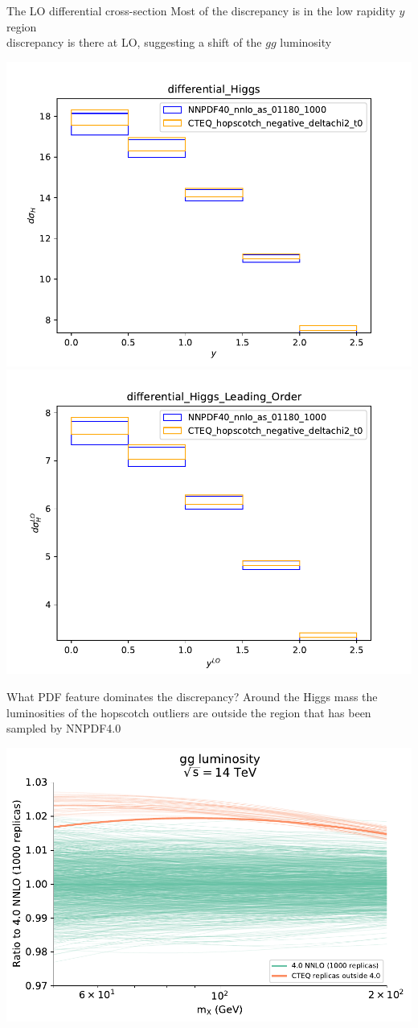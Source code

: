 \documentclass[aspectratio=169,10pt]{beamer}
\begin{document}
\begin{frame}[t]{The LO differential cross-section}
  Most of the discrepancy is in the low rapidity $y$ region\\
  \vspace*{0.5em}
  discrepancy is there at LO, suggesting a shift of the $gg$ luminosity
  \begin{center}
    \includegraphics[width=.48\textwidth]{differential_Higgs.pdf}
    \includegraphics[width=.48\textwidth]{differential_Higgs_Leading_Order.pdf}
  \end{center}
\end{frame}

\begin{frame}[t]{What PDF feature dominates the discrepancy?}
  Around the Higgs mass the luminosities of the hopscotch outliers are outside the region that has been sampled by NNPDF4.0\\
  \begin{center}
    \includegraphics[width=.48\textwidth]{plot_lumi1d_replicas.pdf}
  \end{center}
\end{frame}
\end{document}
